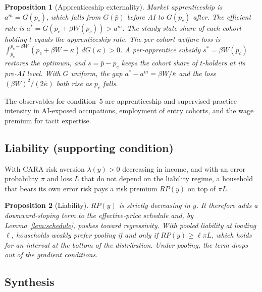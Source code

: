 \documentclass[12pt]{article}
\newtheorem{proposition}{Proposition}
\theoremstyle{remark}
\begin{document}
\begin{proposition}[Apprenticeship externality]\label{prop:apprentice}
Market apprenticeship is $a^m=G(p_c)$, which falls from $G(\bar p)$ before AI to $G(p_c)$ after. The efficient rate is $a^*=G(p_c+\beta W(p_c))>a^m$. The steady-state share of each cohort holding $t$ equals the apprenticeship rate. The per-cohort welfare loss is $\int_{p_c}^{p_c+\beta W}(p_c+\beta W-\kappa)\,dG(\kappa)>0$. A per-apprentice subsidy $s^*=\beta W(p_c)$ restores the optimum, and $s=\bar p-p_c$ keeps the cohort share of $t$-holders at its pre-AI level. With $G$ uniform, the gap $a^*-a^m=\beta W/\bar\kappa$ and the loss $(\beta W)^2/(2\bar\kappa)$ both rise as $p_c$ falls.
\end{proposition}

The observables for condition~5 are apprenticeship and supervised-practice intensity in AI-exposed occupations, employment of entry cohorts, and the wage premium for tacit expertise.

\subsection{Liability (supporting condition)}\label{sec:liability}

With CARA risk aversion $\lambda(y)>0$ decreasing in income, and with an error probability $\pi$ and loss $L$ that do not depend on the liability regime, a household that bears its own error risk pays a risk premium $RP(y)$ on top of $\pi L$.

\begin{proposition}[Liability]\label{prop:liability}
$RP(y)$ is strictly decreasing in $y$. It therefore adds a downward-sloping term to the effective-price schedule and, by Lemma~\ref{lem:schedule}, pushes toward regressivity. With pooled liability at loading $\ell$, households weakly prefer pooling if and only if $RP(y)\ge\ell\pi L$, which holds for an interval at the bottom of the distribution. Under pooling, the term drops out of the gradient conditions.
\end{proposition}

\subsection{Synthesis}\label{sec:synthesis}
\end{document}
